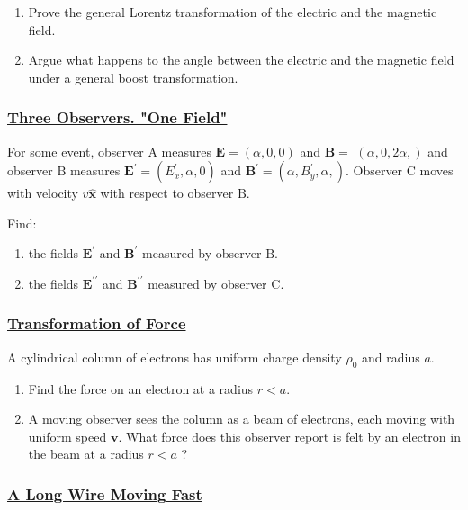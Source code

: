 \begin{enumerate}
	\item Prove the general Lorentz transformation of the electric and the magnetic field.
	\item Argue what happens to the angle between the electric and the magnetic field under a general boost transformation.
\end{enumerate}

\subsubsection{\hyperref[Three Observers. "One Field"]{Three Observers. "One Field"}}

For some event, observer A measures $\mathbf{E}=(\alpha, 0,0)$ and $\mathbf{B}=$ $(\alpha, 0,2 \alpha,)$ and observer $\mathrm{B}$ measures $\mathbf{E}^{\prime}=\left(E_{x}^{\prime}, \alpha, 0\right)$ and $\mathbf{B}^{\prime}=\left(\alpha, B_{y}^{\prime}, \alpha,\right) .$ Observer $\mathrm{C}$ moves with velocity $v \hat{\mathbf{x}}$ with respect to observer $\mathrm{B}$.

Find:

\begin{enumerate}
	\item the fields $\mathbf{E}^{\prime}$ and $\mathbf{B}^{\prime}$ measured by observer $\mathrm{B}$.
	\item the fields $\mathbf{E}^{\prime \prime}$ and $\mathbf{B}^{\prime \prime}$ measured by observer $\mathrm{C}$.
\end{enumerate} 

\subsubsection{\hyperref[Transformation of Force]{Transformation of Force}}

A cylindrical column of electrons has uniform charge density $\rho_{0}$ and radius $a$.

\begin{enumerate}
	\item Find the force on an electron at a radius $r<a$.
	\item A moving observer sees the column as a beam of electrons, each moving with uniform speed $\mathbf{v}$. What force does this observer report is felt by an electron in the beam at a radius $r<a$ ?
\end{enumerate}

\subsubsection{\hyperref[A Long Wire Moving Fast]{A Long Wire Moving Fast}}


